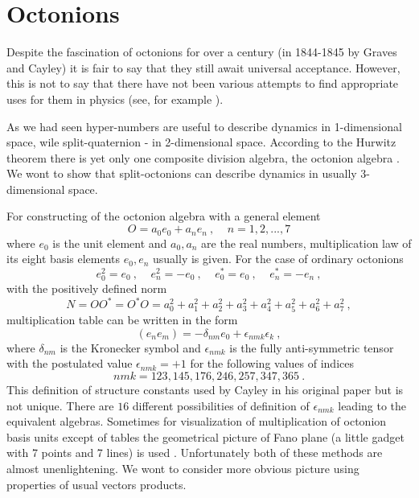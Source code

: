 \documentclass[a4paper,12pt]{article}
\begin{document}
\section{Octonions}

Despite the fascination of octonions for over a century (in 1844-1845 by Graves and Cayley) 
it is fair to say that they still await universal acceptance. However, this is not to say 
that there have not been various attempts to find appropriate uses for them in physics 
(see, for example \cite{SoLo,Qua,Oct,Ku}). 

As we had seen hyper-numbers are useful to describe dynamics in 1-dimensional space, 
wile split-quaternion - in 2-dimensional space. According to the Hurwitz theorem there 
is yet only one composite division algebra, the octonion algebra \cite{Sc}. We wont to 
show that split-octonions can describe dynamics in usually 3-dimensional space.

For constructing of the octonion algebra with a general element
\begin{equation} \label{O}
O = a_0 e_0 + a_n e_n ~, ~~~~~n =1,2, ..., 7
\end{equation}
where $e_0$ is the unit element and $a_0, a_n$ are the real numbers, multiplication law 
of its eight basis elements $e_0, e_n$ usually is given. For the case of ordinary octonions 
\begin{equation} \label{en}
e_0^2 = e_0~,~~~~~ e_n^2 = - e_0~, ~~~~~ e_0^* = e_0 ~, ~~~~~ e_n^* = - e_n ~,
\end{equation}
with the positively defined norm
\begin{equation} \label{NO+}
N = OO^* = O^*O = a_0^2 + a_1^2 + a_2^2 + a_3^2 + a_4^2 + a_5^2 + a_6^2 + a_7^2 ~,
\end{equation}
multiplication table can be written in the form
\begin{equation} \label{ee}
(e_n e_m) = - \delta_{nm}e_0 + \epsilon_{nmk}\epsilon_k ~,
\end{equation}
where $ \delta_{nm}$ is the Kronecker symbol and $\epsilon_{nmk}$ is the fully 
anti-symmetric tensor with the postulated value $\epsilon_{nmk} = + 1$ for the following 
values of indices 
$$
nmk = 123, 145, 176, 246, 257, 347, 365 ~.
$$
This definition of structure constants used by Cayley in his original paper but is not 
unique. There are $16$ different possibilities of definition of $\epsilon_{nmk}$ leading 
to the equivalent algebras. Sometimes for visualization of multiplication of octonion 
basis units except of tables the geometrical picture of Fano plane (a little gadget with 
7 points and 7 lines) is used \cite{Ba}. Unfortunately both of these methods are almost 
unenlightening. We wont to consider more obvious picture using properties of usual vectors 
products. 
\end{document}
